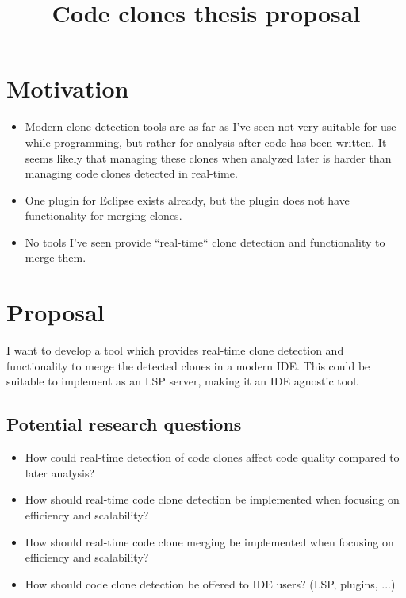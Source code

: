 \documentclass[12pt]{article}
\title{Code clones thesis proposal}
\begin{document}
\maketitle

\section*{Motivation}
\begin{itemize}
	\item  Modern clone detection tools are as far as I've seen not very suitable for use while
	      programming, but rather for analysis after code has been written. It seems
          likely that managing these clones when analyzed later is harder than managing
          code clones detected in real-time.
	\item One plugin for Eclipse exists already, but the plugin does not have
        functionality for merging clones.
    \item No tools I've seen provide ``real-time`` clone detection and functionality to merge
	      them.

\end{itemize}

\section*{Proposal}
I want to develop a tool which provides real-time clone detection and functionality to
merge the detected clones in a modern IDE. This could be suitable to implement as an LSP
server, making it an IDE agnostic tool.
\subsection*{Potential research questions}

\begin{itemize}
	\item How could real-time detection of code clones affect code quality compared to
	      later analysis?

	\item How should real-time code clone detection be implemented when focusing on efficiency and
	      scalability?

	\item How should real-time code clone merging be implemented when focusing on efficiency and
	      scalability?

	\item How should code clone detection be offered to IDE users? (LSP, plugins, ...)
\end{itemize}
\end{document}
